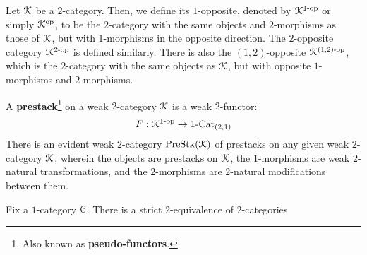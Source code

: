             \begin{convention} \label{conv: 1_opposite_and_2_opposite_categories}
                Let $\mathcal{K}$ be a $2$-category. Then, we define its $1$-opposite, denoted by $\mathcal{K}^{1\text{-}\mathrm{op}}$ or simply $\mathcal{K}^{\mathrm{op}}$, to be the $2$-category with the same objects and $2$-morphisms as those of $\mathcal{K}$, but with $1$-morphisms in the opposite direction. The $2$-opposite category $\mathcal{K}^{2\text{-}\mathrm{op}}$ is defined similarly. There is also the $(1, 2)$-opposite $\mathcal{K}^{(1, 2)\text{-}\mathrm{op}}$, which is the $2$-category with the same objects as $\mathcal{K}$, but with opposite $1$-morphisms and $2$-morphisms.
            \end{convention}
            \begin{definition}[Prestacks] \label{def: prestacks}
                A \textbf{prestack}\footnote{Also known as \textbf{pseudo-functors}.} on a weak $2$-category $\mathcal{K}$ is a weak $2$-functor:
                    $$F: \mathcal{K}^{1\text{-}\mathrm{op}} \to 1\text{-}\mathrm{Cat}_{(2, 1)}$$
                There is an evident weak $2$-category $\mathrm{Pre}\mathrm{Stk}(\mathcal{K})$ of prestacks on any given weak $2$-category $\mathcal{K}$, wherein the objects are prestacks on $\mathcal{K}$, the $1$-morphisms are weak $2$-natural transformations, and the $2$-morphisms are $2$-natural modifications between them.
            \end{definition}
            \begin{theorem} \label{theorem: grothendieck_construction}
                Fix a $1$-category $\mathcal{C}$. There is a strict $2$-equivalence of $2$-categories
            \end{theorem}
            
